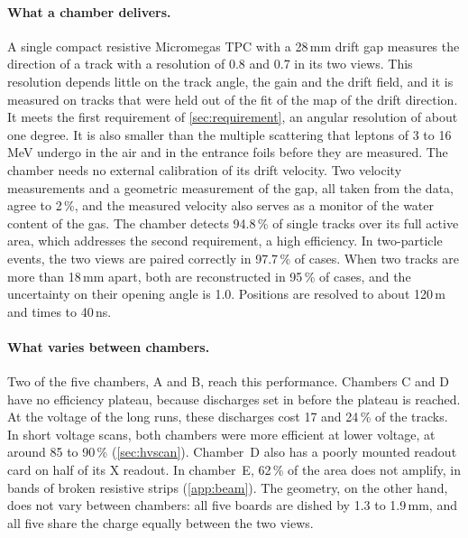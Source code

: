 \paragraph{What a chamber delivers.} A single compact resistive Micromegas TPC with a 28\,mm drift gap measures the
direction of a track with a resolution of 0.8\textdegree{} and 0.7\textdegree{} in its two views. This resolution
depends little on the track angle, the gain and the drift field, and it is measured on tracks that were held out of the
fit of the map of the drift direction. It meets the first requirement of \cref{sec:requirement}, an angular resolution of about one degree. It is
also smaller than the multiple scattering that leptons of 3 to 16\,MeV undergo in the air and in the entrance foils
before they are measured. The chamber needs no external calibration of its drift velocity. Two velocity measurements
and a geometric measurement of the gap, all taken from the data, agree to 2\,\%, and the measured velocity also serves
as a monitor of the water content of the gas. The chamber detects 94.8\,\% of single tracks over its full active area,
which addresses the second requirement, a high efficiency. In two-particle events, the two views are paired correctly
in 97.7\,\% of cases. When two tracks are more than 18\,mm apart, both are reconstructed in 95\,\% of cases, and the
uncertainty on their opening angle is 1.0\textdegree. Positions are resolved to about 120\,\textmu m and times to
40\,ns.

\paragraph{What varies between chambers.} Two of the five chambers, A and B, reach this performance. Chambers C and D have no efficiency plateau, because
discharges set in before the plateau is reached. At the voltage of the long runs, these discharges cost 17 and
24\,\% of the tracks. In short voltage scans, both chambers were more efficient at lower voltage, at around 85 to
90\,\% (\cref{sec:hvscan}). Chamber~D also has a poorly mounted readout card on half of its X readout. In chamber~E, 62\,\% of the area does
not amplify, in bands of broken resistive strips (\cref{app:beam}). The geometry, on the other hand, does not vary between chambers: all five
boards are dished by 1.3 to 1.9\,mm, and all five share the charge equally between the two views.

